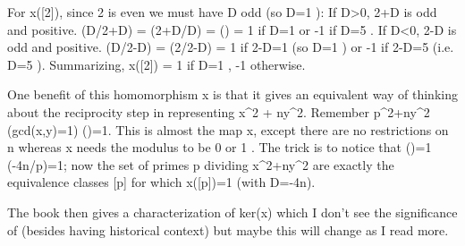 \documentclass[b5paper,12pt,oneside,openright]{memoir}
\begin{document}
For x([2]), since 2 is even we must have D odd (so D=1 ):
If D>0, 2+D is odd and positive. (D/2+D) = (2+D/D) = () = 1 if D=1  or -1 if D=5 .
If D<0, 2-D is odd and positive. (D/2-D) = (2/2-D) = 1 if 2-D=1  (so D=1 ) or -1 if 2-D=5  (i.e. D=5 ).
Summarizing, x([2]) = 1 if D=1 , -1 otherwise.

One benefit of this homomorphism x is that it gives an equivalent way of thinking about the reciprocity step in representing x^2 + ny^2.
Remember p\midx^2+ny^2 (gcd(x,y)=1) \iff ()=1.
This is almost the map x, except there are no restrictions on n whereas x needs the modulus to be 0 or 1 .
The trick is to notice that ()=1 \iff (-4n/p)=1; now the set of primes p dividing x^2+ny^2 are exactly the equivalence classes [p] for which x([p])=1 (with D=-4n).

The book then gives a characterization of ker(x) which I don't see the significance of (besides having historical context) but maybe this will change as I read more.
\end{document}
